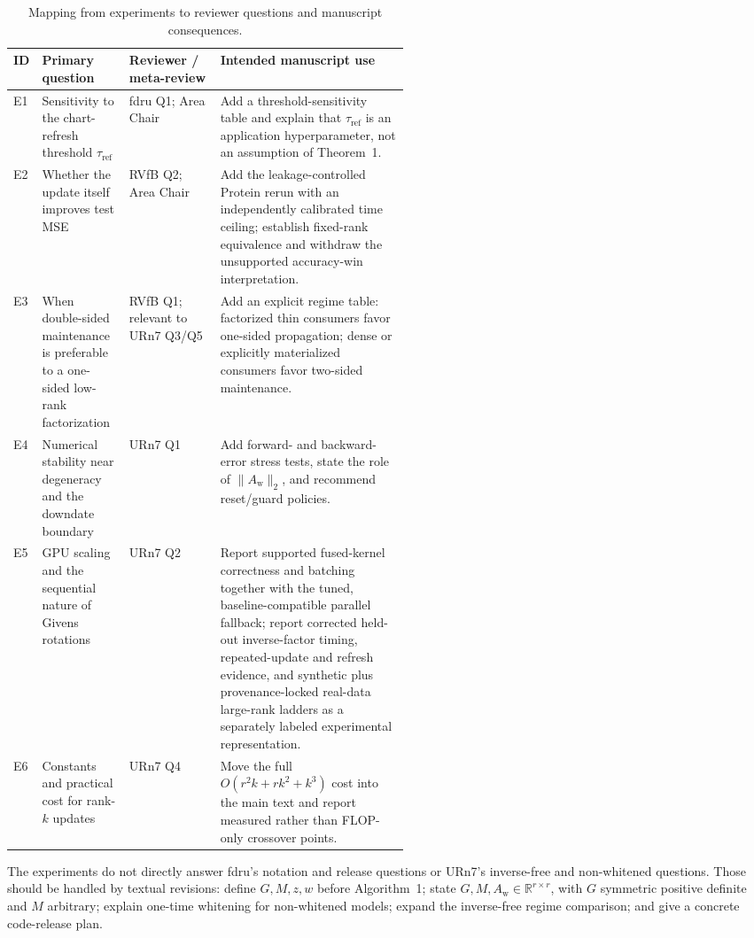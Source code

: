 \documentclass[11pt]{article}
\newcommand{\Aw}{A_{\mathrm w}}
\newcommand{\tref}{\tau_{\mathrm{ref}}}
\newcommand{\R}{\mathbb{R}}
\begin{document}
\begin{table}[ht]
\centering
\small
\caption{Mapping from experiments to reviewer questions and manuscript
consequences.}
\label{tab:review-map}
\begin{tabularx}{\linewidth}{@{}
  >{\raggedright\arraybackslash}p{0.07\linewidth}
  >{\raggedright\arraybackslash}p{0.22\linewidth}
  >{\raggedright\arraybackslash}p{0.23\linewidth}
  >{\raggedright\arraybackslash}X@{}}
\toprule
ID & Primary question & Reviewer / meta-review & Intended manuscript use \\
\midrule
E1 & Sensitivity to the chart-refresh threshold \(\tref\) &
fdru Q1; Area Chair & Add a threshold-sensitivity table and explain that
\(\tref\) is an application hyperparameter, not an assumption of Theorem~1. \\
E2 & Whether the update itself improves test MSE &
RVfB Q2; Area Chair & Add the leakage-controlled Protein rerun with an
independently calibrated time ceiling; establish fixed-rank equivalence and
withdraw the unsupported accuracy-win interpretation. \\
E3 & When double-sided maintenance is preferable to a one-sided low-rank
factorization & RVfB Q1; relevant to URn7 Q3/Q5 & Add an explicit regime table:
factorized thin consumers favor one-sided propagation; dense or explicitly
materialized consumers favor two-sided maintenance. \\
E4 & Numerical stability near degeneracy and the downdate boundary &
URn7 Q1 & Add forward- and backward-error stress tests, state the role of
\(\|\Aw\|_2\), and recommend reset/guard policies. \\
E5 & GPU scaling and the sequential nature of Givens rotations &
URn7 Q2 & Report supported fused-kernel correctness and batching together
with the tuned, baseline-compatible parallel fallback; report corrected
held-out inverse-factor timing, repeated-update and refresh evidence, and
synthetic plus provenance-locked real-data large-rank ladders as a separately
labeled experimental representation. \\
E6 & Constants and practical cost for rank-\(k\) updates &
URn7 Q4 & Move the full \(O(r^2k+rk^2+k^3)\) cost into the main text and report
measured rather than FLOP-only crossover points. \\
\bottomrule
\end{tabularx}
\end{table}

The experiments do not directly answer fdru's notation and release questions
or URn7's inverse-free and non-whitened questions.  Those should be handled by
textual revisions: define \(G,M,z,w\) before Algorithm~1; state
\(G,M,\Aw\in\R^{r\times r}\), with \(G\) symmetric positive definite and \(M\)
arbitrary; explain one-time whitening for non-whitened models; expand the
inverse-free regime comparison; and give a concrete code-release plan.
\end{document}
